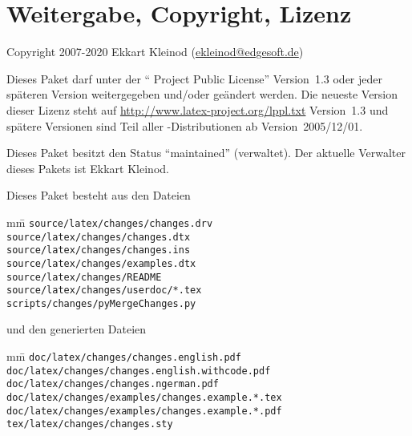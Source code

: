 \cleardoublepage
\section{Weitergabe, Copyright, Lizenz}

Copyright 2007-2020 Ekkart Kleinod (\href{mailto:ekleinod@edgesoft.de}{ekleinod@edgesoft.de})

Dieses Paket darf unter der "` Project Public License"' Version~1.3 oder jeder späteren Version weitergegeben und/oder geändert werden.
Die neueste Version dieser Lizenz steht auf \url{http://www.latex-project.org/lppl.txt} Version~1.3 und spätere Versionen sind Teil aller -Distributionen ab Version~2005/12/01.

Dieses Paket besitzt den Status "`maintained"' (verwaltet).
Der aktuelle Verwalter dieses Pakets ist Ekkart Kleinod.

Dieses Paket besteht aus den Dateien

\begin{tabbing}
	mm\=\kill
	\>\texttt{source/latex/changes/changes.drv}\\
	\>\texttt{source/latex/changes/changes.dtx}\\
	\>\texttt{source/latex/changes/changes.ins}\\
	\>\texttt{source/latex/changes/examples.dtx}\\
	\>\texttt{source/latex/changes/README}\\
	\>\texttt{source/latex/changes/userdoc/*.tex}\\

	\>\texttt{scripts/changes/pyMergeChanges.py}
\end{tabbing}


und den generierten Dateien

\begin{tabbing}
	mm\=\kill
	\>\texttt{doc/latex/changes/changes.english.pdf}\\
	\>\texttt{doc/latex/changes/changes.english.withcode.pdf}\\
	\>\texttt{doc/latex/changes/changes.ngerman.pdf}\\

	\>\texttt{doc/latex/changes/examples/changes.example.*.tex}\\
	\>\texttt{doc/latex/changes/examples/changes.example.*.pdf}\\

	\>\texttt{tex/latex/changes/changes.sty}
\end{tabbing}


